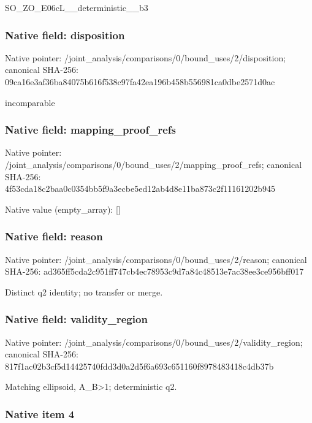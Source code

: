 \documentclass[10pt,a4paper]{article}
\begin{document}
SO\_ZO\_E06cL\_\_deterministic\_\_b3


\subsubsection{Native field: disposition}


Native pointer: /joint\_analysis/comparis\allowbreak{}ons/0/bound\_uses/2/dispo\allowbreak{}sition; canonical SHA-256: 09ca16e3af36ba84075b616f\allowbreak{}538c97fa42ea196b458b5569\allowbreak{}81ca0dbe2571d0ac


incomparable


\subsubsection{Native field: mapping\_proof\_refs}


Native pointer: /joint\_analysis/comparis\allowbreak{}ons/0/bound\_uses/2/mappi\allowbreak{}ng\_proof\_refs; canonical SHA-256: 4f53cda18c2baa0c0354bb5f\allowbreak{}9a3ecbe5ed12ab4d8e11ba87\allowbreak{}3c2f11161202b945



Native value (empty\_array): []



\subsubsection{Native field: reason}


Native pointer: /joint\_analysis/comparis\allowbreak{}ons/0/bound\_uses/2/reaso\allowbreak{}n; canonical SHA-256: ad365ff5cda2c951ff747cb4\allowbreak{}ec78953c9d7a84c48513e7ac\allowbreak{}38ee3ce956bff017


Distinct q2 identity; no transfer or merge.


\subsubsection{Native field: validity\_region}


Native pointer: /joint\_analysis/comparis\allowbreak{}ons/0/bound\_uses/2/valid\allowbreak{}ity\_region; canonical SHA-256: 817f1ac02b3cf5d14425740f\allowbreak{}dd3d0a2d5f6a693c651160f8\allowbreak{}978483418c4db37b


Matching ellipsoid, A\_B>1; deterministic q2.


\subsubsection{Native item 4}
\end{document}

